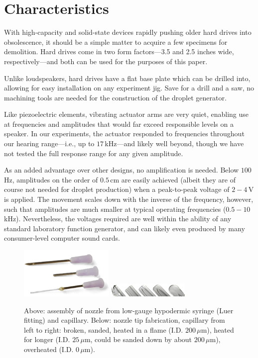 \documentclass[aip,rsi,reprint,graphicx]{revtex4-1} %
\begin{document}
\section{Characteristics}
With high-capacity and solid-state devices rapidly pushing older hard drives
into obsolescence, it should be a simple matter to acquire a few specimens for
demolition. Hard drives come in two form factors---3.5 and 2.5 inches wide,
respectively---and both can be used for the purposes of this paper. 

Unlike loudspeakers, hard drives have a flat base plate which can be drilled
into, allowing for easy installation on any experiment jig. Save for a drill and
a saw, no machining tools are needed for the construction of the droplet
generator.

Like piezoelectric elements, vibrating actuator arms are very quiet, enabling
use at frequencies and amplitudes that would far exceed responsible levels on
a speaker.  In our experiments, the actuator responded to frequencies throughout
our hearing range---i.e., up to $17\,$kHz---and likely well beyond, though we
have not tested the full response range for any given amplitude.

As an added advantage over other designs, no amplification is needed. Below
$100\,$Hz, amplitudes on the order of $0.5\,$cm are easily achieved (albeit they
are of course not needed for droplet production) when a peak-to-peak voltage of
$2-4\,$V is applied. The movement scales down with the inverse of the frequency,
however, such that amplitudes are much smaller at typical operating frequencies
($0.5-10\,$kHz). Nevertheless, the voltages required are well within the ability
of any standard laboratory function generator, and can likely even produced by many
consumer-level computer sound cards.
\begin{figure}
\centering
\includegraphics[width=0.4\textwidth]{hdg_images/needles.png}
\includegraphics[width=0.35\textwidth]{hdg_images/needletips.png}
\caption{Above: assembly of nozzle from
low-gauge hypodermic syringe (Luer fitting) and capillary. Below: nozzle tip
fabrication, capillary from left to right: broken, sanded, heated in a flame (I.D.
$200\,\mu$m), heated for longer (I.D. $25\,\mu$m, could be sanded down by about
$200\,\mu$m), overheated (I.D. $0\,\mu$m). \label{fig:needles}}
\end{figure}
\end{document}
